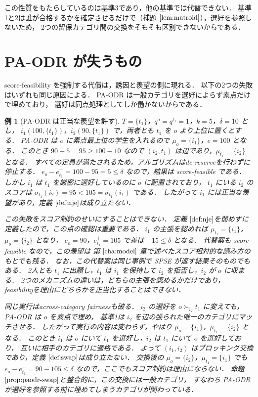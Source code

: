 \documentclass[
    12pt,          %
    a4paper,       %
    oneside,       %
    onecolumn,     %
    titlepage,     %
    final          %
]{jreport} %
\newcommand{\refchapter}[1]{第 $\ref{#1}$ 章}
\newcommand{\refdefinition}[1]{定義 $\ref{#1}$}
\newcommand{\refpropositional}[1]{命題 $\ref{#1}$}
\newcommand{\reflemma}[1]{補題 $\ref{#1}$}
\newtheorem{example}{例}[chapter]
\begin{document}
この性質をもたらしているのは基準3であり，他の基準では代替できない．
基準1と2は誰が合格するかを確定させるだけで（\reflemma{lem:matroid}），選好を参照しないため，
2つの留保カテゴリ間の交換をそもそも区別できないからである．

\section{PA-ODR が失うもの}
\label{sec:paodr-limits}

score-feasibility を強制する代償は，誘因と羨望の側に現れる．
以下の2つの失敗はいずれも同じ原因による．
PA-ODR は一般カテゴリを選好によらず素点だけで埋めており，
選好は同点処理としてしか働かないからである．

\begin{example}[PA-ODR は正当な羨望を許す]
\label{ex:paodr-envy}
$T=\{t_1\}$，$q^o=q^{t_1}=1$，$k=5$，$\delta=10$ とし，
$i_1(100,\{t_1\})$，$i_2(90,\{t_1\})$ で，両者とも $t_1$ を $o$ より上位に置くとする．
PA-ODR は $o$ に素点最上位の学生を入れるので $\mu_o=\{i_1\}$，$e=100$ となる．
このとき $90+5=95\ge100-10$ なので $(i_2,t_1)$ は辺であり，$\mu_{t_1}=\{i_2\}$ となる．
すべての定員が満たされるため，アルゴリズムはde-reserveを行わずに停止する．
$e_o-e_{t_1}^+=100-95=5\le\delta$ なので，結果は score-feasible である．
しかし $i_1$ は $t_1$ を厳密に選好しているのに $o$ に配置されており，
$t_1$ にいる $i_2$ のスコアは $\sigma_{t_1}(i_2)=95<105=\sigma_{t_1}(i_1)$ である．
したがって $i_1$ には正当な羨望があり，\refdefinition{def:nje}は成り立たない．

この失敗をスコア制約のせいにすることはできない．
\refdefinition{def:nje}を弱めずに定義したので，この点の確認は重要である．
$i_1$ の主張を認めれば $\mu_{t_1}=\{i_1\}$，$\mu_o=\{i_2\}$ となり，
$e_o=90$，$e_{t_1}^+=105$ で差は $-15\le\delta$ となる．
代替案も score-feasible なので，この羨望は
\refchapter{cha:model}で述べたスコア相対的な読み方のもとでも残る．
なお，この代替案は同じ事例で SPSE が返す結果そのものでもある．
2人とも $t_1$ に出願し，$t_1$ は $i_1$ を保持して $i_2$ を拒否し，$i_2$ が $o$ に収まる．
2つのメカニズムの違いは，どちらの主張を認めるかだけであり，
feasibilityを理由にどちらかを正当化することはできない．

同じ実行はacross-category fairnessも破る．
$i_2$ の選好を $o\succ_{i_2}t_1$ に変えても，PA-ODR は $o$ を素点で埋め，
基準1は $i_2$ を辺の張られた唯一のカテゴリにマッチさせる．
したがって実行の内容は変わらず，やはり $\mu_o=\{i_1\}$，$\mu_{t_1}=\{i_2\}$ となる．
このとき $i_1$ は $o$ にいて $t_1$ を選好し，$i_2$ は $t_1$ にいて $o$ を選好しており，
互いに相手のカテゴリに適格である．
よって $(i_1,i_2)$ はブロッキング交換であり，\refdefinition{def:swap}は成り立たない．
交換後の $\mu_o=\{i_2\}$，$\mu_{t_1}=\{i_1\}$ でも
$e_o-e_{t_1}^+=90-105\le\delta$ なので，ここでもスコア制約は理由にならない．
\refpropositional{prop:paodr-swap}と整合的に，この交換には一般カテゴリ，
すなわち PA-ODR が選好を参照する前に埋めてしまうカテゴリが関わっている．
\end{example}
\end{document}
